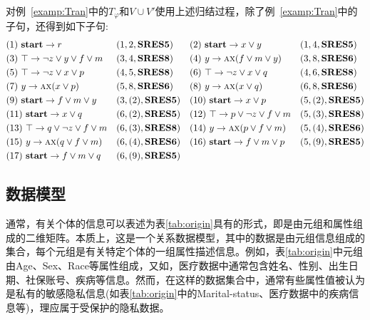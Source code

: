 \begin{example}\label{examp:Res}
	对例~\ref{examp:Tran}中的$T_{\varphi}$和$V\cup V'$使用上述归结过程，除了例~\ref{examp:Tran}中的子句，还得到如下子句:
	\begin{align*}
		&(1)\ \textbf{start} \rightarrow r && (1,2,\textbf{SRES5})
		&&(2)\ \textbf{start} \rightarrow x \vee y && (1,4,\textbf{SRES5})\\
		&(3)\ \top \rightarrow \neg z \vee y \vee f \vee m && (3, 4, \textbf{SRES8})
		&&(4)\ y \rightarrow \textsc{a}\textsc{x}(f\vee m\vee y) && (3,8, \textbf{SRES6})\\
		&(5)\ \top \rightarrow \neg z \vee x \vee p && (4,5, \textbf{SRES8})
		&&(6)\ \top \rightarrow \neg z \vee x \vee q && (4,6, \textbf{SRES8})\\
		&(7)\ y \rightarrow \textsc{a}\textsc{x}(x\vee p) && (5, 8, \textbf{SRES6})
		&&(8)\ y \rightarrow \textsc{a}\textsc{x}(x\vee q) && (6, 8, \textbf{SRES6})\\
		&(9)\ \textbf{start} \rightarrow f\vee m \vee y && (3,(2), \textbf{SRES5}) 
		&&(10)\ \textbf{start} \rightarrow x \vee p && (5,(2),\textbf{SRES5}) \\
		&(11)\ \textbf{start} \rightarrow x \vee q && (6,(2), \textbf{SRES5})
		&& (12)\ \top \rightarrow p \vee \neg z \vee f \vee m && (5,(3), \textbf{SRES8})\\
		& (13)\ \top \rightarrow q \vee \neg z \vee f \vee m && (6,(3), \textbf{SRES8})
		&&(14)\ y \rightarrow \textsc{a}\textsc{x}(p \vee f\vee m) && (5, (4), \textbf{SRES6})\\
		&(15)\ y \rightarrow \textsc{a}\textsc{x}(q \vee f\vee m) && (6, (4), \textbf{SRES6}) 
		&&(16)\ \textbf{start} \rightarrow f\vee m \vee p && (5, (9), \textbf{SRES5}) \\
		&(17)\ \textbf{start} \rightarrow f\vee m \vee q && (6, (9), \textbf{SRES5})
	\end{align*}
\end{example}

\subsection{数据模型}
通常，有关个体的信息可以表述为表\ref{tab:origin}具有的形式，即是由元组和属性组成的二维矩阵。本质上，这是一个关系数据模型，其中的数据是由元组信息组成的集合，每个元组是有关特定个体的一组属性描述信息。例如，表\ref{tab:origin}中元组由Age、Sex、Race等属性组成，又如，医疗数据中通常包含姓名、性别、出生日期、社保账号、疾病等信息。然而，在这样的数据集合中，通常有些属性值被认为是私有的敏感隐私信息(如表\ref{tab:origin}中的Marital-status、医疗数据中的疾病信息等)，理应属于受保护的隐私数据。

